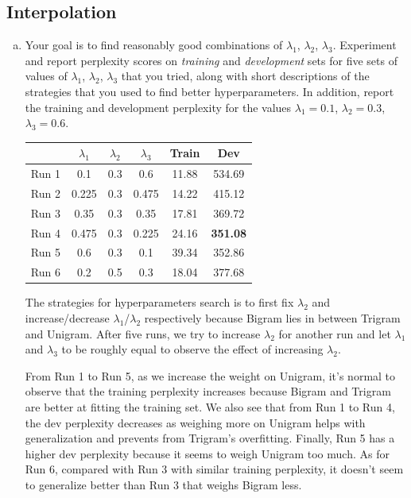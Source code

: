 \documentclass{article}
\newenvironment{solution}{\color{blue}}{}
\begin{document}
\subsection{Interpolation}
\begin{enumerate}[(a)]
  \item Your goal is to find reasonably good combinations of 
  $\lambda_1$, $\lambda_2$, $\lambda_3$. 
  Experiment and report perplexity scores on \textit{training} and 
  \textit{development} sets for five sets of values of 
  $\lambda_1$, $\lambda_2$, $\lambda_3$ that you tried, along with short 
  descriptions of the strategies that you used to find better hyperparameters. 
  In addition, report the training and development perplexity for the values 
  $\lambda_1 = 0.1$, $\lambda_2 = 0.3$, $\lambda_3 = 0.6$.

  \begin{solution}
    \begin{center}
      \begin{tabular}{| c | c | c | c | c | c |}
        \hline
        & $\lambda_1$ & $\lambda_2$ & $\lambda_3$ & Train & Dev \\ \hline
        Run 1 & 0.1 & 0.3 & 0.6 & 11.88 & 534.69 \\ \hline
        Run 2 & 0.225 & 0.3 & 0.475 & 14.22 & 415.12 \\ \hline
        Run 3 & 0.35 & 0.3 & 0.35 & 17.81 & 369.72 \\ \hline
        Run 4 & 0.475 & 0.3 & 0.225 & 24.16 & \textbf{351.08} \\ \hline
        Run 5 & 0.6 & 0.3 & 0.1 & 39.34 & 352.86 \\ \hline
        Run 6 & 0.2 & 0.5 & 0.3 & 18.04 & 377.68 \\ \hline
      \end{tabular}
    \end{center}

    The strategies for hyperparameters search is to first fix $\lambda_2$ and 
    increase/decrease $\lambda_1$/$\lambda_2$ respectively because Bigram lies 
    in between Trigram and Unigram. After five runs, we try to increase $\lambda_2$
    for another run and let $\lambda_1$ and $\lambda_3$ to be roughly equal to observe 
    the effect of increasing $\lambda_2$. 

    From Run 1 to Run 5, as we increase the weight on Unigram, it's normal to observe 
    that the training perplexity increases because Bigram and Trigram are better at 
    fitting the training set. We also see that from Run 1 to Run 4, the dev perplexity 
    decreases as weighing more on Unigram helps with generalization and prevents from 
    Trigram's overfitting. Finally, Run 5 has a higher dev perplexity because it seems 
    to weigh Unigram too much. As for Run 6, compared with Run 3 with similar training 
    perplexity, it doesn't seem to generalize better than Run 3 that weighs Bigram less.
  \end{solution}
    

\end{enumerate}
\end{document}
